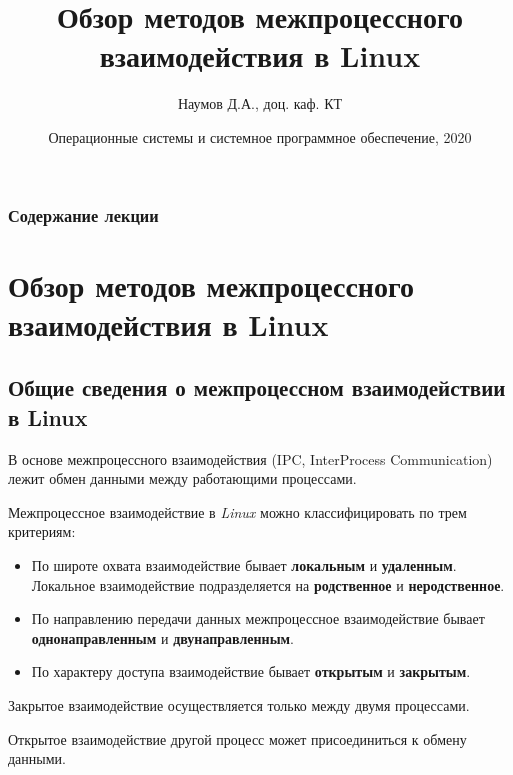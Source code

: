 \documentclass[xcolor=table]{beamer}
\title[Межпроцессное взаимодействие]{Обзор методов межпроцессного взаимодействия в Linux}
\author{Наумов Д.А., доц. каф. КТ}
\date[13.11.2020] {Операционные системы и системное программное обеспечение, 2020}
\begin{document}
\begin{frame}
  \titlepage
\end{frame}
  
\begin{frame}
  \frametitle{Содержание лекции}
  \tableofcontents  
\end{frame}

\section{Обзор методов межпроцессного взаимодействия в Linux}

\subsection{Общие сведения о межпроцессном взаимодействии в Linux}

\begin{frame}
	В основе межпроцессного взаимодействия (IPC, InterProcess Communication) лежит обмен данными между работающими процессами. 

	Межпроцессное взаимодействие в \textit{Linux} можно классифицировать по трем критериям:
	\begin{itemize}
		\item По широте охвата взаимодействие бывает \textbf{локальным} и \textbf{удаленным}. Локальное взаимодействие подразделяется на \textbf{родственное} и \textbf{неродственное}.
		\item По направлению передачи данных межпроцессное взаимодействие бывает \textbf{однонаправленным} и \textbf{двунаправленным}.
		\item По характеру доступа взаимодействие бывает \textbf{открытым} и \textbf{закрытым}.
	\end{itemize}
	\begin{block}{Закрытое взаимодействие}
		осуществляется только между двумя процессами.
	\end{block}
	\begin{block}{Открытое взаимодействие}
		другой процесс может присоединиться к обмену данными.
	\end{block}
\end{frame}
\end{document}
